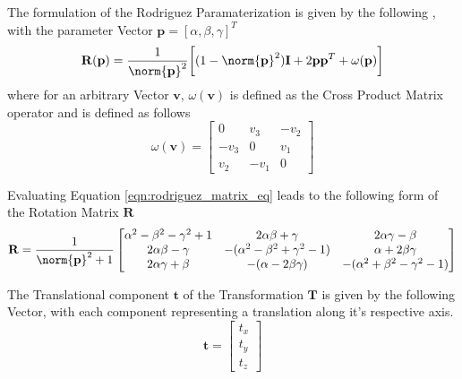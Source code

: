 The formulation of the Rodriguez Paramaterization is given by the following 
\cite{Shuster1993}, with the parameter Vector
$\mathbf{p} = [\alpha, \beta, \gamma]^{T}$
\begin{equation}
  \label{eqn:rodriguez_matrix_eq}
  \mathbf{R}(\mathbf{p}) =
  \frac{1}{\norm{\mathbf{p}}^{2}}
  \bigg[
  (1 - \norm{\mathbf{p}}^{2})\mathbf{I} +
  2 \mathbf{pp}^{T} + \omega(\mathbf{p})
  \bigg]
\end{equation}
where for an arbitrary Vector $\mathbf{v}$, $\omega(\mathbf{v})$ is defined as
the Cross Product Matrix operator and is defined as follows
\begin{equation}
  \label{eqn:cross_prod_mat}
  \omega(\mathbf{v}) =
  \begin{bmatrix}
    0 & v_{3} & -v_{2} \\
    -v_{3} & 0 & v_{1} \\
    v_{2} & -v_{1} & 0
  \end{bmatrix}
\end{equation}

Evaluating Equation \ref{eqn:rodriguez_matrix_eq} leads to the following form
of the Rotation Matrix $\mathbf{R}$
\begin{equation}
  \label{eqn:rodriguez_matrix}
  \mathbf{R} = \frac{1}{\norm{\mathbf{p}}^{2} + 1}
  \begin{bmatrix}
    \alpha^{2} - \beta^{2} - \gamma^{2} + 1 &
    2 \alpha \beta + \gamma &
    2 \alpha \gamma - \beta \\
    2 \alpha \beta - \gamma &
    -(\alpha^{2} - \beta^{2} + \gamma^{2} - 1) &
    \alpha + 2 \beta \gamma \\
    2 \alpha \gamma + \beta &
    -(\alpha - 2 \beta \gamma) &
    -(\alpha^{2} + \beta^{2} - \gamma^{2} - 1)
  \end{bmatrix}
\end{equation}

The Translational component $\mathbf{t}$ of the Transformation $\mathbf{T}$ is
given by the following Vector, with each component representing a translation
along it's respective axis.
\begin{equation}
  \label{eqn:trans_vector}
  \mathbf{t} =
  \begin{bmatrix}
    t_{x} \\
    t_{y} \\
    t_{z}
  \end{bmatrix}
\end{equation}

